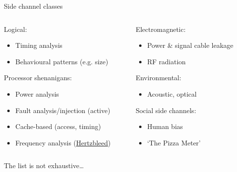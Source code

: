 \begin{frame}{Side channel classes}
  \begin{columns}[T,onlytextwidth]
    \begin{column}{0.5\textwidth}
      \pause
      Logical:
      \begin{itemize}[<+(1)->]
        \item Timing analysis
        \item Behavioural patterns (e.g. size)
      \end{itemize}

      \pause
      Processor shenanigans:
      \begin{itemize}[<+(1)->]
        \item Power analysis
        \item Fault analysis/injection (active)
        \item Cache-based (access, timing)
        \item Frequency analysis (\href{https://www.hertzbleed.com}{Hertzbleed})
      \end{itemize}
      \end{column}
    \begin{column}{0.5\textwidth}
      \pause
      Electromagnetic:
      \begin{itemize}[<+(1)->]
        \item Power \& signal cable leakage
        \item RF radiation
      \end{itemize}

      \pause
      Environmental:
      \begin{itemize}[<+(1)->]
        \item Acoustic, optical
      \end{itemize}

      \pause
      Social side channels:
      \begin{itemize}[<+(1)->]
        \item Human bias
        \item `The Pizza Meter'
      \end{itemize}
    \end{column}
  \end{columns}

  \vspace*{2em}

  \pause
  The list is not exhaustive\dots
\end{frame}

